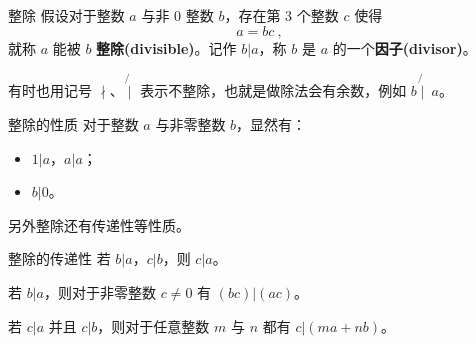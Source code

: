 
\begin{definition}{整除}
假设对于整数 $a$ 与非 $0$ 整数 $b$，存在第 $3$ 个整数 $c$ 使得
\begin{equation}
a = bc ~,
\end{equation}
就称 $a$ 能被 $b$ \textbf{整除(divisible)}。记作 $b | a$，称 $b$ 是 $a$ 的一个\textbf{因子(divisor)}。
\end{definition}

有时也用记号 $\nmid$、$\not{\mid}$ 表示不整除，也就是做除法会有余数，例如 $b \not{\mid}~ a$。

\begin{corollary}{整除的性质}
对于整数 $a$ 与非零整数 $b$，显然有：
\begin{itemize}
\item $1 | a$，$a | a$；
\item $b | 0$。
\end{itemize}
\end{corollary}

另外整除还有传递性等性质。
\begin{theorem}{整除的传递性}
若 $b|a$，$c|b$，则 $c|a$。
\end{theorem}
\begin{theorem}{}
若 $b|a$，则对于非零整数 $c \neq 0$ 有 $(bc) | (ac)$。
\end{theorem}
\begin{theorem}{}
若 $c|a$ 并且 $c|b$，则对于任意整数 $m$ 与 $n$ 都有 $c | (ma + nb)$。
\end{theorem}